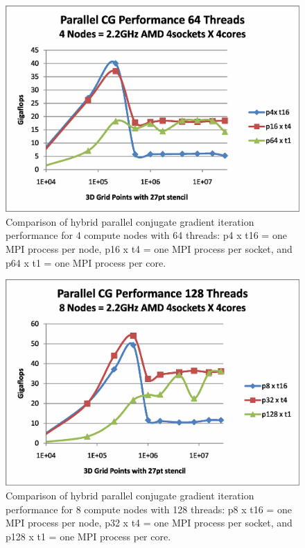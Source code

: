 \begin{figure}[h]
\center
\includegraphics[viewport=1in 0.5in 8.5in 6.5in,angle=0,scale=0.5]{test-hhpccg-intel-11.1-mpi.exe.np4.no-overlap.2.eps}
\caption{Comparison of hybrid parallel conjugate gradient iteration performance for 4 compute nodes with 64 threads: p4 x t16 = one MPI process per node, p16 x t4 = one MPI process per socket, and p64 x t1 = one MPI process per core.}
\label{fig:CGPerf:np4}
\end{figure}

\begin{figure}[h]
\center
\includegraphics[viewport=1in 0.5in 8.5in 6.5in,angle=0,scale=0.5]{test-hhpccg-intel-11.1-mpi.exe.np8.no-overlap.2.eps}
\caption{Comparison of hybrid parallel conjugate gradient iteration performance for 8 compute nodes with 128 threads: p8 x t16 = one MPI process per node, p32 x t4 = one MPI process per socket, and p128 x t1 = one MPI process per core.}
\label{fig:CGPerf:np8}
\end{figure}

